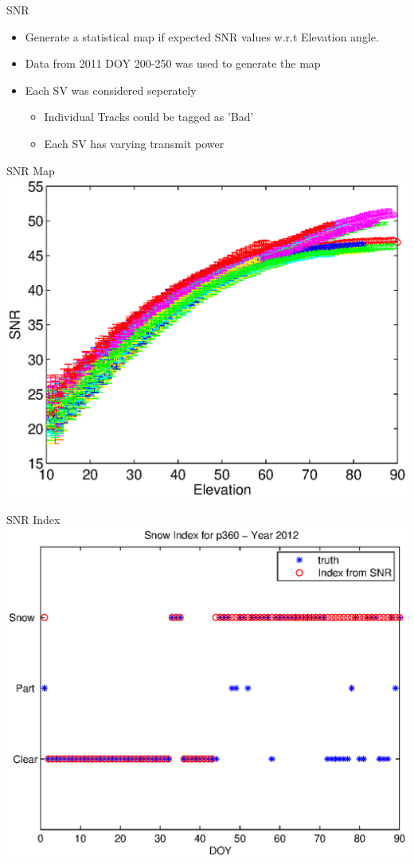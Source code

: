 \documentclass{beamer}
\begin{document}


\begin{frame}{SNR}
  \begin{itemize}
  \item Generate a statistical map if expected SNR values w.r.t Elevation angle.
  \item Data from 2011 DOY 200-250 was used to generate the map
  \item Each SV was considered seperately
    \begin{itemize}
    \item Individual Tracks could be tagged as 'Bad'
    \item Each SV has varying transmit power
    \end{itemize}
  \end{itemize}
\end{frame}

\begin{frame}{SNR Map}
  \includegraphics[width=1\linewidth,clip=true]{snrMap.eps}
\end{frame}

\begin{frame}{SNR Index}
  \includegraphics[width=1\linewidth,clip=true]{snrIndex.eps}
\end{frame}
\end{document}
